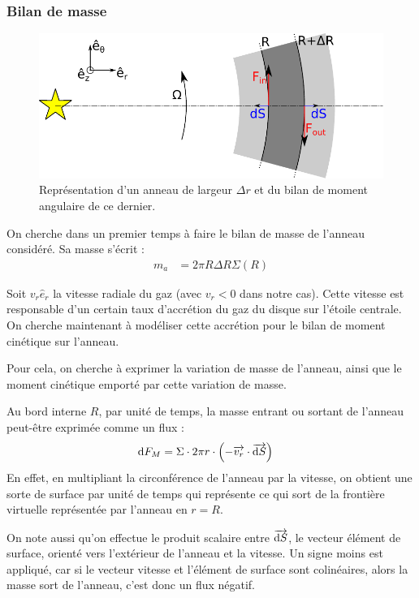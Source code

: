 \subsubsection{Bilan de masse}
\begin{figure}[htb]
\centering
\includegraphics[width=0.7\linewidth]{figure/disk_ring.pdf}
\caption{Représentation d'un anneau de largeur $\Delta r$ et du bilan de moment angulaire de ce dernier.}\label{fig:disk_ring}
\end{figure}

On cherche dans un premier temps à faire le bilan de masse de l'anneau considéré. Sa masse s'écrit :
\begin{align}
m_a &= 2\pi R \Delta R \Sigma(R)\label{eq:m_a}
\end{align}

\bigskip

Soit $v_r\hat{e}_r$ la vitesse radiale du gaz (avec $v_r<0$ dans notre cas). Cette vitesse est responsable d'un certain taux d'accrétion du gaz du disque sur l'étoile centrale. On cherche maintenant à modéliser cette accrétion pour le bilan de moment cinétique sur l'anneau.

Pour cela, on cherche à exprimer la variation de masse de l'anneau, ainsi que le moment cinétique emporté par cette variation de masse. 

Au bord interne $R$, par unité de temps, la masse entrant ou sortant de l'anneau peut-être exprimée comme un flux :
\begin{align}
\operatorname{d \!} F_M &= \Sigma \cdot 2\pi r \cdot \left( -{\overrightarrow{v_r}} \cdot {\overrightarrow{\operatorname{d \!}S}} \right)
\end{align}
En effet, en multipliant la circonférence de l'anneau par la vitesse, on obtient une sorte de surface par unité de temps qui représente ce qui sort de la frontière virtuelle représentée par l'anneau en $r=R$. 

On note aussi qu'on effectue le produit scalaire entre ${\overrightarrow{\operatorname{d \!} S}}$, le vecteur élément de surface, orienté vers l'extérieur de l'anneau et la vitesse. Un signe moins est appliqué, car si le vecteur vitesse et l'élément de surface sont colinéaires, alors la masse sort de l'anneau, c'est donc un flux négatif.

